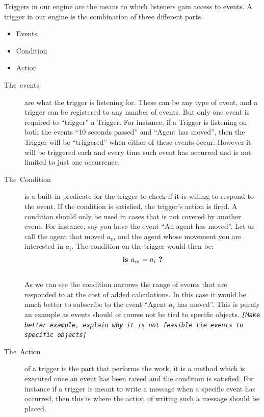 Triggers in our engine are the means to which listeners gain access
to events. A trigger in our engine is the combination of three different
parts.
\begin{itemize}
\item Events
\item Condition
\item Action\end{itemize}
\begin{description}
\item [{The~events}] are what the trigger is listening for. These can
be any type of event, and a trigger can be registered to any number
of events. But only one event is required to \textquotedblleft{}trigger\textquotedblright{}
a Trigger. For instance, if a Trigger is listening on both the events
\textquotedblleft{}10 seconds passed\textquotedblright{} and \textquotedblleft{}Agent
has moved\textquotedblright{}, then the Trigger will be \textquotedblleft{}triggered\textquotedblright{}
when either of these events occur. However it will be triggered each
and every time such event has occurred and is not limited to just
one occurrence.
\item [{The~Condition}] is a built in predicate for the trigger to check
if it is willing to respond to the event. If the condition is satisfied,
the trigger\textquoteright{}s action is fired. A condition should
only be used in cases that is not covered by another event. For instance,
say you have the event \textquotedblleft{}An agent has moved\textquotedblright{}.
Let us call the agent that moved $a_{m}$ and the agent whose movement
you are interested in $a_{i}$. The condition on the trigger would
then be: 
\[
\textrm{\textbf{is }}a_{m}=a_{i}\textbf{ ?}
\]
\\
As we can see the condition narrows the range of events that are responded
to at the cost of added calculations. In this case it would be much
better to subscribe to the event \textquotedblleft{}Agent $a_{i}$
has moved\textquotedblright{}. This is purely an example as events
should of course not be tied to specific objects. \texttt{\emph{{[}Make
better example, explain why it is not feasible tie events to specific
objects{]}}}
\item [{The~Action}] of a trigger is the part that performs the work,
it is a method which is executed once an event has been raised and
the condition is satisfied. For instance if a trigger is meant to
write a message when a specific event has occurred, then this is where
the action of writing such a message should be placed.
\end{description}

